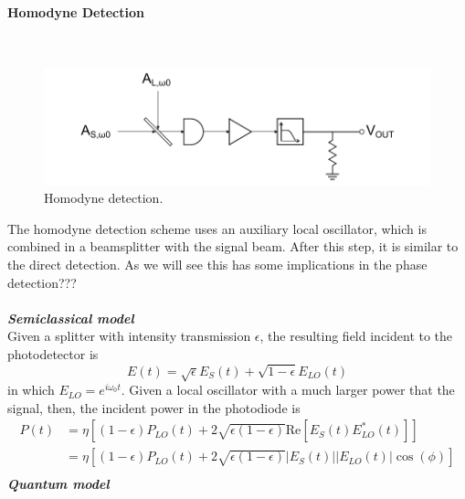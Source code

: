 \begin{bibunit}[plain]
\paragraph{Homodyne Detection}\ \\
%
%
\begin{figure}[H]
	\centering
	\includegraphics{./sdf/optical_detection/figures/detection-homodyne.pdf}
	\caption{Homodyne detection.}
\end{figure}
The homodyne detection scheme uses an auxiliary local oscillator, which is combined in
a beamsplitter with the signal beam. After this step, it is similar to the direct detection. As we will see this has some implications in the phase detection???\\
\\
{\bf \em Semiclassical model}\\
Given a splitter with intensity transmission $\epsilon$, the resulting field incident to the photodetector is
\cite{shapiro1985} %
%
\begin{equation}
	E(t) = \sqrt{\epsilon}E_S(t) + \sqrt{1-\epsilon}E_{LO}(t)
\end{equation}
%
in which $E_{LO} = e^{i \omega_0 t}$.
Given a local oscillator with a much larger power that the signal, then, the incident power in the photodiode is
%
\begin{align}
	P(t)	&= \eta \left[ (1-\epsilon) P_{LO}(t) + 2 \sqrt{\epsilon (1-\epsilon)} \textrm{Re} \left[ E_S(t) E^\ast_{LO}(t) \right] \right]\\
			&= \eta \left[ (1-\epsilon) P_{LO}(t) + 2 \sqrt{\epsilon (1-\epsilon)} |E_S(t)| |E_{LO}(t)| \cos{(\phi)} \right]\\
\end{align}
%
%
{\bf \em Quantum model}\\
%
%

\end{bibunit}
